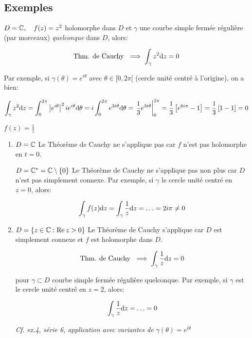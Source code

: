 \subsection{Exemples}

\begin{example}[1]
    $D = \mathbb{C}, \quad f(z) = z^2$ holomorphe dans $D$ et $\gamma$ une courbe simple fermée régulière (par morceaux) \textit{quelconque} dans $D$, alors:
    
    \[\textrm{Thm. de Cauchy } \implies \int_\gamma z^2 \mathrm{d}z = 0\]
    
    Par exemple, si $\gamma(\theta) = e^{i\theta}$ avec $\theta \in [0, 2\pi[$ (cercle unité centré à l'origine), on a bien:
    
    \[
    \int_\gamma z^2 \mathrm{d}z =
    \int_0^{2\pi} \left|e^{i\theta}\right|^2 i e^{i\theta}\mathrm{d}\theta =
    i \int_0^{2\pi} e^{3 i\theta}\mathrm{d}\theta =
    \left.\frac{1}{3} e^{3 i\theta}\right|_0^{2\pi} =
    \frac{1}{3} \left[e^{6 i \pi} - 1\right] =
    \frac{1}{3} \left[1 - 1\right] =
    0
    \]
\end{example}

\begin{example}[2]
    $f(z) = \frac{1}{z}$
    
    \begin{enumerate}[label=\alph*)]
    \item 
    $D = \mathbb{C}$ Le Théorème de Cauchy ne s'applique pas car $f$ n'est pas holomorphe en $t = 0$.
    
    $D = \mathbb{C}^\ast = \mathbb{C} \setminus \{0\}$
    Le Théorème de Cauchy ne s'applique pas non plus car $D$ n'est pas simplement connexe.
    Par exemple, si $\gamma$ le cercle unité centré en $z = 0$, alors:
    
    \[
    \int_\gamma f(z)\mathrm{d}z = \int_\gamma \frac{1}{z} \mathrm{d}z = \ldots = 2i\pi \neq 0
    \]
    
    \item 
    $D = \{z \in \mathbb{C} : \operatorname{Re} z > 0\}$
    Le Théorème de Cauchy s'applique car $D$ est simplement connexe et $f$ est holomorphe dans $D$.
    
    \[\textrm{Thm. de Cauchy } \implies \int_\gamma \frac{1}{z} \mathrm{d}z = 0\]
    
    pour $\gamma \subset D$ courbe simple fermée régulière quelconque.
    Par exemple, si $\gamma$ est le cercle unité centré en $z = 2$, alors:
    
    \[
    \int_\gamma \frac{1}{z} \mathrm{d}z = \ldots = 0
    \]
    
    \textit{Cf. ex.4, série 6, application avec variantes de $\gamma(\theta) = e^{i\theta}$}
    \end{enumerate}
\end{example}

